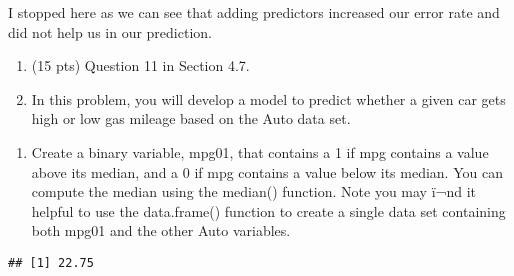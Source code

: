 \documentclass[]{article}
\newenvironment{Shaded}{\begin{snugshade}}{\end{snugshade}}
\newcommand{\KeywordTok}[1]{\textcolor[rgb]{0.13,0.29,0.53}{\textbf{#1}}}
\newcommand{\DecValTok}[1]{\textcolor[rgb]{0.00,0.00,0.81}{#1}}
\newcommand{\StringTok}[1]{\textcolor[rgb]{0.31,0.60,0.02}{#1}}
\newcommand{\OperatorTok}[1]{\textcolor[rgb]{0.81,0.36,0.00}{\textbf{#1}}}
\newcommand{\NormalTok}[1]{#1}
\providecommand{\tightlist}{%
  \setlength{\itemsep}{0pt}\setlength{\parskip}{0pt}}
\begin{document}
I stopped here as we can see that adding predictors increased our error
rate and did not help us in our prediction.

\begin{enumerate}
\def\labelenumi{\arabic{enumi}.}
\setcounter{enumi}{8}
\item
  (15 pts) Question 11 in Section 4.7.
\item
  In this problem, you will develop a model to predict whether a given
  car gets high or low gas mileage based on the Auto data set.
\end{enumerate}

\begin{enumerate}
\def\labelenumi{(\alph{enumi})}
\tightlist
\item
  Create a binary variable, mpg01, that contains a 1 if mpg contains a
  value above its median, and a 0 if mpg contains a value below its
  median. You can compute the median using the median() function. Note
  you may ï¬nd it helpful to use the data.frame() function to create a
  single data set containing both mpg01 and the other Auto variables.
\end{enumerate}

\begin{Shaded}
\end{Shaded}

\begin{verbatim}
## [1] 22.75
\end{verbatim}

\begin{Shaded}
\end{Shaded}
\end{document}
